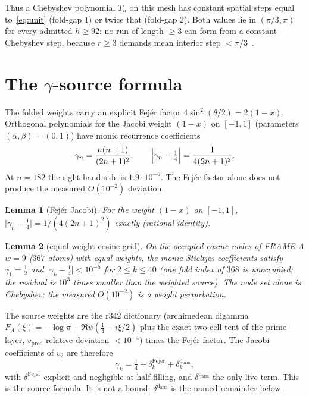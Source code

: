 \documentclass[11pt]{article}
\newtheorem{lemma}{Lemma}
\theoremstyle{remark}
\begin{document}
Thus a Chebyshev polynomial $T_n$ on this mesh has constant
spatial steps equal to~\eqref{eq:unit} (fold-gap $1$) or twice
that (fold-gap $2$).  Both values lie in $(\pi/3,\pi)$ for every
admitted $h\ge 92$: no run of length $\ge 3$ can form from a
constant Chebyshev step, because $r\ge 3$ demands mean interior
step $<\pi/3$~\cite{v2lem}.

\section{The $\gamma$-source formula}\label{sec:gamma}

The folded weights carry an explicit Fej\'er factor
$4\sin^2(\theta/2)=2(1-x)$.  Orthogonal polynomials for the
Jacobi weight $(1-x)$ on $[-1,1]$ (parameters $(\alpha,\beta)=(0,1)$)
have monic recurrence coefficients
\[
\gamma_n=\frac{n(n+1)}{(2n+1)^2},\qquad
\Bigl\lvert\gamma_n-\tfrac14\Bigr\rvert
=\frac{1}{4(2n+1)^2}.
\]
At $n=182$ the right-hand side is $1.9\cdot 10^{-6}$.  The
Fej\'er factor alone does not produce the measured
$O(10^{-2})$ deviation.

\begin{lemma}[Fej\'er Jacobi]\label{lem:fejer}
For the weight $(1-x)$ on $[-1,1]$,
$\lvert\gamma_n-\tfrac14\rvert=1/(4(2n+1)^2)$ exactly
(rational identity).
\end{lemma}

\begin{lemma}[equal-weight cosine grid]\label{lem:eqwt}
On the occupied cosine nodes of FRAME-A $w=9$ ($367$ atoms)
with equal weights, the monic Stieltjes coefficients satisfy
$\gamma_1=\tfrac12$ and $\lvert\gamma_k-\tfrac14\rvert<10^{-5}$
for $2\le k\le 40$ (one fold index of $368$ is unoccupied; the
residual is $10^3$ times smaller than the weighted source).  The node set alone is Chebyshev; the
measured $O(10^{-2})$ is a \emph{weight} perturbation.
\end{lemma}

The source weights are the r342 dictionary (archimedean
digamma $F_A(\xi)=-\log\pi+\Re\psi(\tfrac14+i\xi/2)$ plus the
exact two-cell tent of the prime layer, $v_{\mathrm{pred}}$
relative deviation $<10^{-4}$) times the Fej\'er factor.  The
Jacobi coefficients of $v_2$ are therefore
\[
\gamma_k
=\tfrac14
+\delta_k^{\mathrm{Fejer}}
+\delta_k^{\mathrm{d_{arm}}},
\]
with $\delta^{\mathrm{Fejer}}$ explicit and negligible at
half-filling, and $\delta^{\mathrm{d_{arm}}}$ the only live
term.  This is the source formula.  It is not a bound:
$\delta^{\mathrm{d_{arm}}}$ is the named remainder below.
\end{document}
